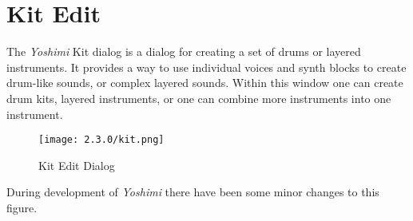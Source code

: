 %
%
%

\section{Kit Edit}
\label{sec:kit_edit}

   The \textsl{Yoshimi} Kit dialog is a dialog for creating a
   set of drums or layered instruments.
   It provides a way to use individual voices and synth blocks to create
   drum-like sounds, or complex layered sounds.
   Within this window one can create drum kits, layered instruments, or one
   can combine more instruments into one instrument.

\begin{figure}[H]
   \centering
   \texttt{[image: 2.3.0/kit.png]}
   \caption{Kit Edit Dialog}
   \label{fig:kit_edit_dialog}
\end{figure}

   During development of \textsl{Yoshimi} there have been some minor changes to
   this figure.

